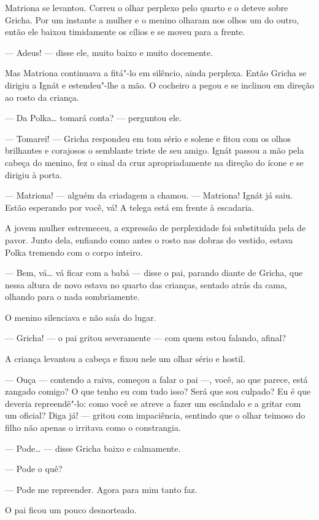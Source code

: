 Matriona se levantou. Correu o olhar perplexo pelo quarto e o deteve
sobre Gricha. Por um instante a mulher e o menino olharam nos olhos um
do outro, então ele baixou timidamente os cílios e se moveu para a
frente.

--- Adeus! --- disse ele, muito baixo e muito docemente.

Mas Matriona continuava a fitá"-lo em silêncio, ainda perplexa. Então
Gricha se dirigiu a Ignát e estendeu"-lhe a mão. O cocheiro a pegou e se
inclinou em direção ao rosto da criança.

--- Da Polka\ldots{} tomará conta? --- perguntou ele.

--- Tomarei! --- Gricha respondeu em tom sério e solene e fitou com os
olhos brilhantes e corajosos o semblante triste de seu amigo. Ignát
passou a mão pela cabeça do menino, fez o sinal da cruz apropriadamente
na direção do ícone e se dirigiu à porta.

--- Matriona! --- alguém da criadagem a chamou. --- Matriona! Ignát já
saiu. Estão esperando por você, vá! A telega está em frente à escadaria.

A jovem mulher estremeceu, a expressão de perplexidade foi substituída
pela de pavor. Junto dela, enfiando como antes o rosto nas dobras do
vestido, estava Polka tremendo com o corpo inteiro.

--- Bem, vá\ldots{} vá ficar com a babá --- disse o pai, parando diante de
Gricha, que nessa altura de novo estava no quarto das crianças, sentado
atrás da cama, olhando para o nada sombriamente.

O menino silenciava e não saía do lugar.

--- Gricha! --- o pai gritou severamente --- com quem estou falando,
afinal?

A criança levantou a cabeça e fixou nele um olhar sério e hostil.

--- Ouça --- contendo a raiva, começou a falar o pai ---, você, ao que
parece, está zangado comigo? O que tenho eu com tudo isso? Será que sou
culpado? Eu é que deveria repreendê"-lo: como você se atreve a fazer um
escândalo e a gritar com um oficial? Diga já! --- gritou com
impaciência, sentindo que o olhar teimoso do filho não apenas o
irritava como o constrangia.

--- Pode\ldots{} --- disse Gricha baixo e calmamente.

--- Pode o quê?

--- Pode me repreender. Agora para mim tanto faz.

O pai ficou um pouco desnorteado.

